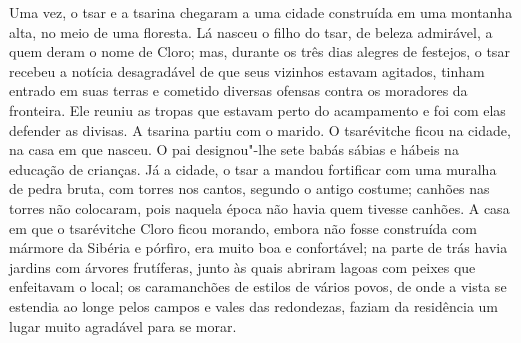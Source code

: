 Uma vez, o tsar e a tsarina chegaram a uma cidade construída em uma
montanha alta, no meio de uma floresta. Lá nasceu o filho do tsar, de
beleza admirável, a quem deram o nome de Cloro; mas, durante os três
dias alegres de festejos, o tsar recebeu a notícia desagradável de que
seus vizinhos estavam agitados, tinham entrado em suas terras e cometido
diversas ofensas contra os moradores da fronteira. Ele reuniu as tropas
que estavam perto do acampamento e foi com elas defender as divisas. A
tsarina partiu com o marido. O tsarévitche ficou na cidade, na casa em
que nasceu. O pai designou"-lhe sete babás sábias e hábeis na educação de
crianças. Já a cidade, o tsar a mandou fortificar com uma muralha de
pedra bruta, com torres nos cantos, segundo o antigo costume; canhões
nas torres não colocaram, pois naquela época não havia quem tivesse
canhões. A casa em que o tsarévitche Cloro ficou morando, embora não
fosse construída com mármore da Sibéria e pórfiro, era muito boa e
confortável; na parte de trás havia jardins com árvores frutíferas,
junto às quais abriram lagoas com peixes que enfeitavam o local; os
caramanchões de estilos de vários povos, de onde a vista se estendia ao
longe pelos campos e vales das redondezas, faziam da residência um lugar
muito agradável para se morar.

